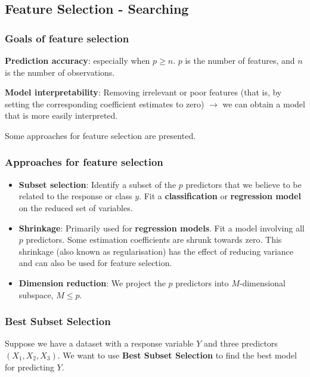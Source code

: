 \subsection{Feature Selection - Searching}

\subsubsection{Goals of feature selection}

\indent 

\textbf{Prediction accuracy}: especially when $p\geq n$. $p$ is the number of features, and $n$ is the number of observations.

\textbf{Model interpretability}: Removing irrelevant or poor features (that is, by setting the corresponding coefficient estimates to zero) $\xrightarrow{}$ we can obtain a model that is more easily interpreted.

Some approaches for feature selection are presented.

\subsubsection{Approaches for feature selection}

\indent 

\begin{itemize}
    \item \textbf{Subset selection}: Identify a subset of the $p$ predictors that we believe to be related to the response or class $y$. Fit a \textbf{classification} or \textbf{regression model} on the reduced set of variables.
    \item \textbf{Shrinkage}: Primarily used for \textbf{regression models}. Fit a model involving all $p$ predictors. Some estimation coefficients are shrunk towards zero. This shrinkage (also known as regularisation) has the effect of reducing variance and can also be used for feature selection.
    \item \textbf{Dimension reduction}: We project the $p$ predictors into $M$-dimensional subspace, $M\leq p$.
\end{itemize}

\subsubsection{Best Subset Selection}

\indent 

Suppose we have a dataset with a response variable $Y$ and three predictors $(X_1,X_2,X_3)$. We want to use \textbf{Best Subset Selection} to find the best model for predicting $Y$.

